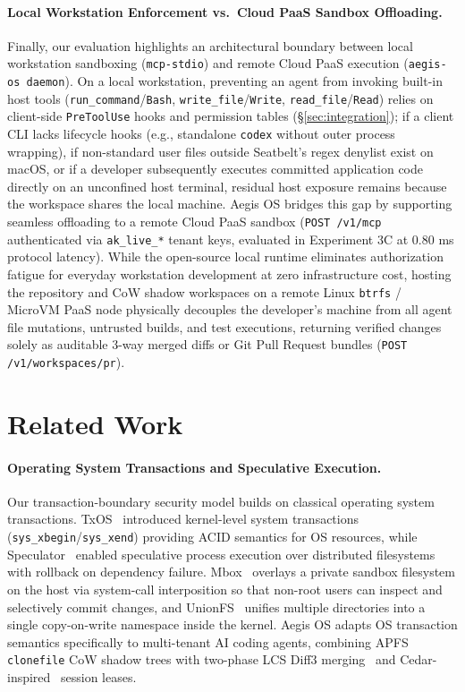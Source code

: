 \documentclass[acmsmall,screen,review]{acmart}
\begin{document}
\paragraph{Local Workstation Enforcement vs.\ Cloud PaaS Sandbox Offloading.} Finally, our evaluation highlights an architectural boundary between local workstation sandboxing (\texttt{mcp-stdio}) and remote Cloud PaaS execution (\texttt{aegis-os daemon}). On a local workstation, preventing an agent from invoking built-in host tools (\texttt{run\_command}/\texttt{Bash}, \texttt{write\_file}/\texttt{Write}, \texttt{read\_file}/\texttt{Read}) relies on client-side \texttt{PreToolUse} hooks and permission tables (\S\ref{sec:integration}); if a client CLI lacks lifecycle hooks (e.g., standalone \texttt{codex} without outer process wrapping), if non-standard user files outside Seatbelt's regex denylist exist on macOS, or if a developer subsequently executes committed application code directly on an unconfined host terminal, residual host exposure remains because the workspace shares the local machine. Aegis OS bridges this gap by supporting seamless offloading to a remote Cloud PaaS sandbox (\texttt{POST /v1/mcp} authenticated via \texttt{ak\_live\_*} tenant keys, evaluated in Experiment 3C at 0.80 ms protocol latency). While the open-source local runtime eliminates authorization fatigue for everyday workstation development at zero infrastructure cost, hosting the repository and CoW shadow workspaces on a remote Linux \texttt{btrfs} / MicroVM PaaS node physically decouples the developer's machine from all agent file mutations, untrusted builds, and test executions, returning verified changes solely as auditable 3-way merged diffs or Git Pull Request bundles (\texttt{POST /v1/workspaces/pr}).

\section{Related Work}
\label{sec:related}

\paragraph{Operating System Transactions and Speculative Execution.} Our transaction-boundary security model builds on classical operating system transactions. TxOS~\cite{porter2009txos} introduced kernel-level system transactions (\texttt{sys\_xbegin}/\texttt{sys\_xend}) providing ACID semantics for OS resources, while Speculator~\cite{nightingale2005speculator} enabled speculative process execution over distributed filesystems with rollback on dependency failure. Mbox~\cite{kim2013mbox} overlays a private sandbox filesystem on the host via system-call interposition so that non-root users can inspect and selectively commit changes, and UnionFS~\cite{wright2004unionfs} unifies multiple directories into a single copy-on-write namespace inside the kernel. Aegis OS adapts OS transaction semantics specifically to multi-tenant AI coding agents, combining APFS \texttt{clonefile} CoW shadow trees with two-phase LCS Diff3 merging~\cite{khanna2007formal,apel2011semistructured} and Cedar-inspired~\cite{cutler2024cedar} session leases.
\end{document}
